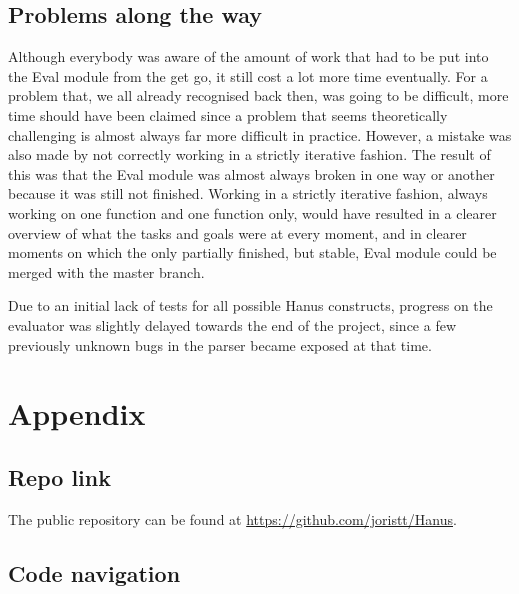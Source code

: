 \documentclass[12pt,a4paper]{article}
\begin{document}
    \subsection{Problems along the way}
        Although everybody was aware of the amount of work that had to be put into the Eval module from the get go, it still cost a lot more time eventually. For a problem that, we all already recognised back then, was going to be difficult, more time should have been claimed since a problem that seems theoretically challenging is almost always far more difficult in practice. However, a mistake was also made by not correctly working in a strictly iterative fashion. The result of this was that the Eval module was almost always broken in one way or another because it was still not finished. Working in a strictly iterative fashion, always working on one function and one function only, would have resulted in a clearer overview of what the tasks and goals were at every moment, and in clearer moments on which the only partially finished, but stable, Eval module could be merged with the master branch.
        
Due to an initial lack of tests for all possible Hanus constructs, progress on the evaluator was slightly delayed towards the end of the project, since a few previously unknown bugs in the parser became exposed at that time. 

\section{Appendix}
    \subsection{Repo link}
    The public repository can be found at \url{https://github.com/joristt/Hanus}.
    \subsection{Code navigation}

\newpage


\end{document}
